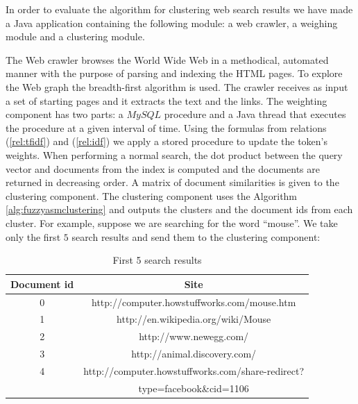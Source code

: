 In order to evaluate the algorithm for clustering web search results \cite{Gaceanu10AnAdaptive} we have made a Java application containing the following module: a web crawler, a weighing module and a clustering module. 

The Web crawler browses the World Wide Web in a methodical, automated manner with the purpose of parsing and indexing the HTML pages. To explore the Web graph the breadth-first
algorithm is used. The crawler receives as input a set of starting pages and it extracts the text and the links. 	
The weighting component has two parts: a $MySQL$ procedure and a Java thread that executes the procedure at a given interval of time. Using the formulas from relations (\ref{rel:tfidf}) and (\ref{rel:idf}) we apply a stored procedure to update the token's weights. When performing a normal search, the dot product between the query vector and documents from the index is computed and the documents are returned in decreasing order.
A matrix of document similarities is given to the clustering component. The clustering component uses the Algorithm \ref{alg:fuzzyasmclustering} and outputs the clusters and the document ids from each cluster. For example, suppose we are searching for the word ``mouse''. We take only the first $5$ search results and send them to the clustering component:

\begin{table}[ht] 
\caption{First 5 search results} %
\centering %
\begin{tabular}{cc} %
\hline\hline %
Document id  & Site  \\ [0.5ex] %
\hline %
0 & http://computer.howstuffworks.com/mouse.htm \\ %
1 & http://en.wikipedia.org/wiki/Mouse \\
2 & http://www.newegg.com/ \\
3 & http://animal.discovery.com/  \\
4 & http://computer.howstuffworks.com/share-redirect? \\
& type=facebook\&cid=1106  \\ 

\hline %
\end{tabular} 
\label{table:nonlin} %
\end{table}

